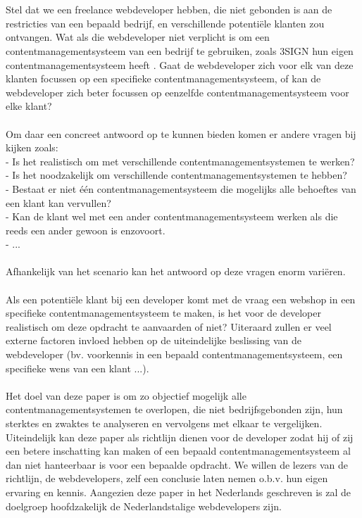 \\\\
Stel dat we een freelance webdeveloper hebben, die niet gebonden is aan de restricties van een bepaald bedrijf, en verschillende potentiële klanten zou ontvangen. Wat als die webdeveloper niet verplicht is om een contentmanagementsysteem van een bedrijf te gebruiken, zoals 3SIGN hun eigen contentmanagementsysteem heeft \autocite{Meiresonne2008}. Gaat de webdeveloper zich voor elk van deze klanten focussen op een specifieke contentmanagementsysteem, of kan de webdeveloper zich beter focussen op eenzelfde contentmanagementsysteem voor elke klant? 
\\\\
Om daar een concreet antwoord op te kunnen bieden komen er andere vragen bij kijken zoals:\\
- Is het realistisch om met verschillende contentmanagementsystemen te werken?\\
- Is het noodzakelijk om verschillende contentmanagementsystemen te hebben?\\
- Bestaat er niet één contentmanagementsysteem die mogelijks alle behoeftes van een klant kan vervullen?\\ 
- Kan de klant wel met een ander contentmanagementsysteem werken als die reeds een ander gewoon is enzovoort.\\
- ... 
\\\\
Afhankelijk van het scenario kan het antwoord op deze vragen enorm variëren. 
\\\\
Als een potentiële klant bij een developer komt met de vraag een webshop in een specifieke contentmanagementsysteem te maken, is het voor de developer realistisch om deze opdracht te aanvaarden of niet? Uiteraard zullen er veel externe factoren invloed hebben op de uiteindelijke beslissing van de webdeveloper (bv. voorkennis in een bepaald contentmanagementsysteem, een specifieke wens van een klant ...). 
\\\\
Het doel van deze paper is om zo objectief mogelijk alle contentmanagementsystemen te overlopen, die niet bedrijfsgebonden zijn, hun sterktes en zwaktes te analyseren en vervolgens met elkaar te vergelijken. Uiteindelijk kan deze paper als richtlijn dienen voor de developer zodat hij of zij een betere inschatting kan maken of een bepaald contentmanagementsysteem al dan niet hanteerbaar is voor een bepaalde opdracht. We willen de lezers van de richtlijn, de webdevelopers, zelf een conclusie laten nemen o.b.v. hun eigen ervaring en kennis. Aangezien deze paper in het Nederlands geschreven is zal de doelgroep hoofdzakelijk de Nederlandstalige webdevelopers zijn.
\\\\

